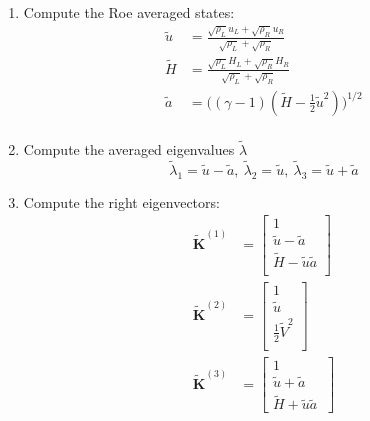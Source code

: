 \documentclass[a4paper]{article}
\numberwithin{equation}{section}
\begin{document}
\begin{enumerate}
    \item Compute the Roe averaged states:
    \begin{equation}
        \begin{split}
            \tilde{u} &= \frac{\sqrt{\rho_L} u_L + \sqrt{\rho_R} u_R 
            }{\sqrt{\rho_L} + \sqrt{\rho_R}}\\
            \tilde{H} &= \frac{\sqrt{\rho_L} H_L + \sqrt{\rho_R} H_R 
            }{\sqrt{\rho_L} + \sqrt{\rho_R}}\\
            \tilde{a} &= \biggl((\gamma - 1) (\tilde
            H - \frac{1}{2} \tilde{u}^2)\biggr)^{1/2}\\
        \end{split}
    \end{equation}
    \item Compute the averaged eigenvalues $\tilde{\lambda}$
    \begin{equation}
        \tilde{\lambda}_1 = \tilde{u} - \tilde{a},\ \tilde{\lambda}_2 = \tilde{u}, \ \tilde{\lambda}_3 = \tilde{u} + \tilde{a}
    \end{equation}
    \item Compute the right eigenvectors:
    \begin{equation}
        \begin{split}
            \tilde{\mathbf{K}}^{(1)} &= 
            \begin{bmatrix}
                1\\
                \tilde{u} - \tilde{a}\\
                \tilde{H} - \tilde{u}\tilde{a}\\
            \end{bmatrix}\\
            \tilde{\mathbf{K}}^{(2)} &= 
            \begin{bmatrix}
                1\\
                \tilde{u}\\
                \frac{1}{2}\tilde{V}^2\\
            \end{bmatrix}\\
            \tilde{\mathbf{K}}^{(3)} &= 
            \begin{bmatrix}
                1\\
                \tilde{u} + \tilde{a}\\
                \tilde{H} + \tilde{u}\tilde{a}\
            \end{bmatrix}\\

\end{split}
\end{equation}
\end{enumerate}
\end{document}
